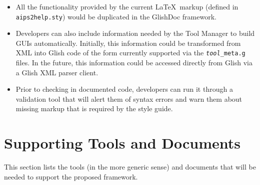 \begin{itemize}
\item All the functionality provided by the current \LaTeX\ markup
(defined in {\tt aips2help.sty}) would be duplicated in the GlishDoc
framework.  

\item Developers can also include information needed by the Tool
Manager to build GUIs automatically.  Initially, this information
could be transformed from XML into Glish code of the form currently
supported via the {\tt {\it tool}\_meta.g} files.  In the future, this
information could be accessed directly from Glish via a Glish XML parser
client.  

\item Prior to checking in documented code, developers can run it
through a validation tool that will alert them of syntax errors and
warn them about missing markup that is required by the style guide.  

\end{itemize}

\section{Supporting Tools and Documents}

This section lists the tools (in the more generic sense) and documents
that will be needed to support the proposed framework.

